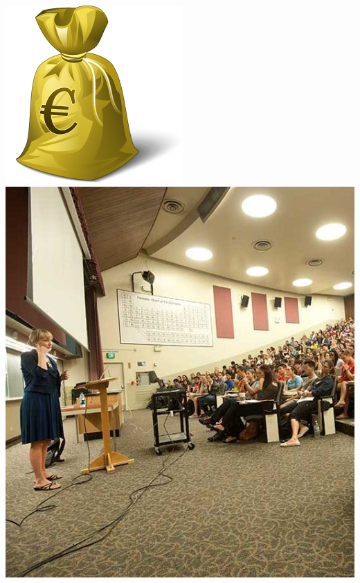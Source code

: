 \begin{frame}
\begin{columns}
    \begin{column}{0.2\textwidth}
      \includegraphics[width=.9\textwidth]{images/moneybag_euro}\\
      \bigskip
      \includegraphics[width=.9\textwidth]{images/bigclass}
    \end{column}
  \end{columns}
\end{frame}

